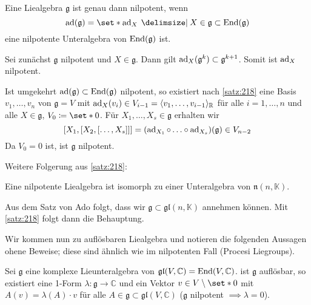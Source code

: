 \begin{korollar}[label=korr:219]
	Eine Liealgebra $\mathfrak{g}$ ist genau dann nilpotent, wenn 
	\[
		\ad(\mathfrak{g}) = \set*{\ad_X \given X \in \mathfrak{g}} \subset \End(\mathfrak{g})
	\]
	eine nilpotente Unteralgebra von $\operatorname{End}(\mathfrak{g})$ ist.
\end{korollar}
\begin{beweis}
	Sei zunächst $\mathfrak{g}$ nilpotent und $X \in \mathfrak{g}$.
	Dann gilt $\operatorname{ad}_X(\mathfrak{g}^k) \subset \mathfrak{g}^{k+1}$.
	Somit ist $\operatorname{ad}_X$ nilpotent.
	
	Ist umgekehrt $\operatorname{ad}(\mathfrak{g}) \subset \operatorname{End}(\mathfrak{g})$ nilpotent, so existiert nach \autoref{satz:218} eine Basis $v_1, \ldots ,v_n$ von $\mathfrak{g}=V$ mit $\operatorname{ad}_X(v_i) \in V_{i-1} = \langle v_1 ,\ldots ,v_{i-1}\rangle_\mathbb{R}$ für alle $i=1,\ldots ,n$ und alle $X \in \mathfrak{g}$, $V_0 \coloneqq \set*{0}$.
	Für $X_1, \ldots ,X_s \in \mathfrak{g}$ erhalten wir 
	\[
		 \benbrace*{X_1, \benbrace*{X_2, \benbrace*{\ldots ,X_s}}}=\enbrace*{\ad_{X_1} \circ \ldots \circ \ad_{X_s}}(\mathfrak{g}) \in V_{n-2}
	\]
	Da $V_0=0$ ist, ist $\mathfrak{g}$ nilpotent.
\end{beweis}

Weitere Folgerung aus \autoref{satz:218}:

\begin{korollar}
	Eine nilpotente Liealgebra ist isomorph zu einer Unteralgebra von $\mathfrak{n}(n,\mathbb{K})$.
\end{korollar}
\begin{beweis}
	Aus dem Satz von Ado folgt, dass wir $\mathfrak{g} \subset \mathfrak{gl}(n,\mathbb{K})$ annehmen können. 
	Mit \autoref{satz:218} folgt dann die Behauptung.
\end{beweis}

Wir kommen nun zu auflösbaren Liealgebra und notieren die folgenden Aussagen ohene Beweise; diese sind ähnlich wie im nilpotenten Fall (Procesi Liegroups).

\begin{satz}[{name={Lie}},label=satz:2111]
	Sei $\mathfrak{g}$ eine komplexe Lieunteralgebra von $\mathfrak{gl}(V,\mathbb{C})=\operatorname{End}(V,\mathbb{C})$.
	ist $\mathfrak{g}$ auflösbar, so existiert eine 1-Form $\lambda \colon \mathfrak{g} \to \mathbb{C}$ und ein Vektor $v \in V\setminus \set*{0}$ mit $A(v)= \lambda(A) \cdot v$ für alle $A \in \mathfrak{g} \subset \mathfrak{gl}(V,\mathbb{C})$ ($\mathfrak{g}$ nilpotent $\implies \lambda=0$).
\end{satz}

